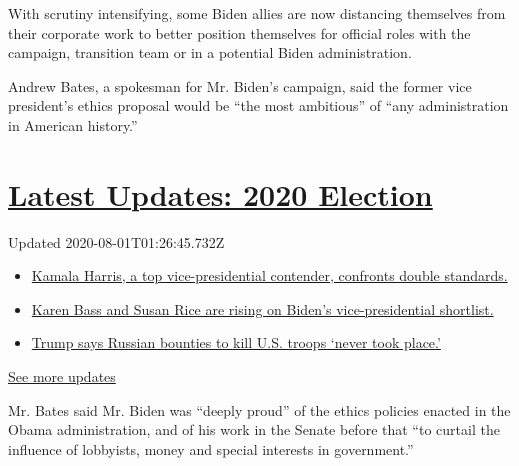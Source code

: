 With scrutiny intensifying, some Biden allies are now distancing
themselves from their corporate work to better position themselves for
official roles with the campaign, transition team or in a potential
Biden administration.

Andrew Bates, a spokesman for Mr. Biden's campaign, said the former vice
president's ethics proposal would be ``the most ambitious'' of ``any
administration in American history.''

\hypertarget{latest-updates-2020-election}{%
\section{\texorpdfstring{\href{https://www.nytimes3xbfgragh.onion/2020/07/31/us/elections/biden-vs-trump.html?action=click\&pgtype=Article\&state=default\&region=MAIN_CONTENT_1\&context=storylines_live_updates}{Latest
Updates: 2020
Election}}{Latest Updates: 2020 Election}}\label{latest-updates-2020-election}}

Updated 2020-08-01T01:26:45.732Z

\begin{itemize}
\tightlist
\item
  \href{https://www.nytimes3xbfgragh.onion/2020/07/31/us/elections/biden-vs-trump.html?action=click\&pgtype=Article\&state=default\&region=MAIN_CONTENT_1\&context=storylines_live_updates\#link-29fdff45}{Kamala
  Harris, a top vice-presidential contender, confronts double
  standards.}
\item
  \href{https://www.nytimes3xbfgragh.onion/2020/07/31/us/elections/biden-vs-trump.html?action=click\&pgtype=Article\&state=default\&region=MAIN_CONTENT_1\&context=storylines_live_updates\#link-13ec3d9c}{Karen
  Bass and Susan Rice are rising on Biden's vice-presidential
  shortlist.}
\item
  \href{https://www.nytimes3xbfgragh.onion/2020/07/31/us/elections/biden-vs-trump.html?action=click\&pgtype=Article\&state=default\&region=MAIN_CONTENT_1\&context=storylines_live_updates\#link-49e9a016}{Trump
  says Russian bounties to kill U.S. troops `never took place.'}
\end{itemize}

\href{https://www.nytimes3xbfgragh.onion/2020/07/31/us/elections/biden-vs-trump.html?action=click\&pgtype=Article\&state=default\&region=MAIN_CONTENT_1\&context=storylines_live_updates}{See
more updates}

Mr. Bates said Mr. Biden was ``deeply proud'' of the ethics policies
enacted in the Obama administration, and of his work in the Senate
before that ``to curtail the influence of lobbyists, money and special
interests in government.''

